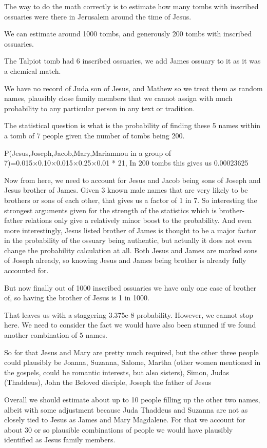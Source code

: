The way to do the math correctly is to estimate how many tombs with inscribed ossuaries were there in Jerusalem around the time of Jesus.

We can estimate around 1000 tombs, and generously 200 tombs with inscribed ossuaries.

The Talpiot tomb had 6 inscribed ossuaries, we add James ossuary to it as it was a chemical match.

We have no record of Juda son of Jesus, and Mathew so we treat them as random names, plausibly close family members that we cannot assign with much probability to any particular person in any text or tradition.

The statistical question is what is the probability of finding these 5 names within a tomb of 7 people given the number of tombs being 200.

P(Jesus,Joseph,Jacob,Mary,Mariamnou in a group of 7)=0.015×0.10×0.015×0.25×0.01 * 21, In 200 tombs this gives us 0.00023625

Now from here, we need to account for Jesus and Jacob being sons of Joseph and Jesus brother of James.
Given 3 known male names that are very likely to be brothers or sons of each other, that gives us a factor of 1 in 7.
So interesting the strongest arguments given for the strength of the statistics which is brother-father relations only give a relatively minor boost to the probability.
And even more interestingly, Jesus listed brother of James is thought to be a major factor in the probability of the ossuary being authentic, but actually it does not even change the probability calculation at all.
Both Jesus and James are marked sons of Joseph already, so knowing Jesus and James being brother is already fully accounted for.

But now finally out of 1000 inscribed ossuaries we have only one case of brother of, so having the brother of Jesus is 1 in 1000.

That leaves us with a staggering 3.375e-8 probability.
However, we cannot stop here.
We need to consider the fact we would have also been stunned if we found another combination of 5 names.

So for that Jesus and Mary are pretty much required, but the other three people could plausibly be Joanna, Suzanna, Salome, Martha (other women mentioned in the gospels, could be romantic interests, but also sisters), Simon, Judas (Thaddeus), John the Beloved disciple, Joseph the father of Jesus

Overall we should estimate about up to 10 people filling up the other two names, albeit with some adjustment because Juda Thaddeus and Suzanna are not as closely tied to Jesus as James and Mary Magdalene.
For that we account for about 30 or so plausible combinations of people we would have plausibly identified as Jesus family members.

